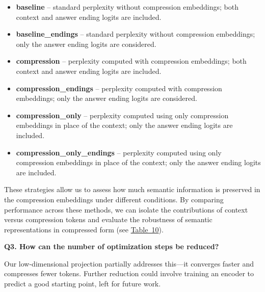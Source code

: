 \begin{itemize}
    \item \textbf{baseline} – standard perplexity without compression embeddings; both context and answer ending logits are included.
    \item \textbf{baseline\_endings} – standard perplexity without compression embeddings; only the answer ending logits are considered.
    \item \textbf{compression} – perplexity computed with compression embeddings; both context and answer ending logits are included.
    \item \textbf{compression\_endings} – perplexity computed with compression embeddings; only the answer ending logits are considered.
    \item \textbf{compression\_only} – perplexity computed using only compression embeddings in place of the context; only the answer ending logits are included.
    \item \textbf{compression\_only\_endings} – perplexity computed using only compression embeddings in place of the context; only the answer ending logits are included.
\end{itemize}


These strategies allow us to assess how much semantic information is preserved in the compression embeddings under different conditions. By comparing performance across these methods, we can isolate the contributions of context versus compression tokens and evaluate the robustness of semantic representations in compressed form (see \href{https://drive.google.com/file/d/1-qex3vN5c7WCSDDHi2bbBT29Cgy0oYZO/view?usp=sharing}{Table~10}).

\textbf{Q3. How can the number of optimization steps be reduced?}

Our low-dimensional projection partially addresses this---it converges faster and compresses fewer tokens. Further reduction could involve training an encoder to predict a good starting point, left for future work.

